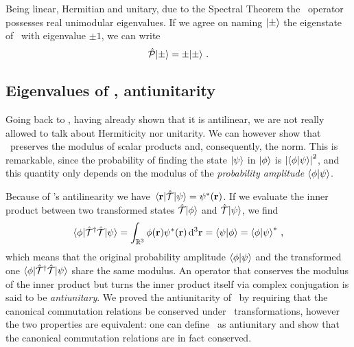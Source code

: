             Being linear, Hermitian and unitary, due to the Spectral Theorem the \hP\ operator possesses real unimodular eigenvalues. If we agree on naming $\ket{\pm}$ the eigenstate of \hP\ with eigenvalue $\pm 1$, we can write
            \begin{equation}
                \label{eq:eigenvalue-problem-P}
                \mathcal{\hat{P}}\!\ket{\pm}
                = \pm\!\ket{\pm}\,\text{.}
            \end{equation}
        
        \subsection{Eigenvalues of \hT, antiunitarity}
            Going back to \hT, having already shown that it is antilinear, we are not really allowed to talk about Hermiticity nor unitarity. We can however show that \hT\ preserves the modulus of scalar products and, consequently, the norm. This is remarkable, since the probability of finding the state $\ket{\psi}$ in $\ket{\phi}$ is $\abs{\braket{\phi}{\psi}}^2$, and this quantity only depends on the modulus of the \emph{probability amplitude} $\braket{\phi}{\psi}$.
            
            Because of \hT's antilinearity we have $\mel{\vb{r}}{\hT}{\psi} = \psi^*\pqty{\vb{r}}$. If we evaluate the inner product between two transformed states $\mathcal{\hat{T}}\!\ket{\phi}$ and $\mathcal{\hat{T}}\!\ket{\psi}$, we find
            \begin{equation*}
                \bra{\phi}\!\hT^\dag\hT\!\ket{\psi}
                = \int\nolimits_{\bbR^3} \phi\pqty{\vb{r}}\psi^*\pqty{\vb{r}}\dd[3]{\vb{r}}
                = \bra{\psi}\ket{\phi}
                = \bra{\phi}\ket{\psi}^*
                \mycomma
            \end{equation*}
            which means that the original probability amplitude $\braket{\phi}{\psi}$ and the transformed one $\bra{\phi}\!\mathcal{\hat{T}}^\dag\mathcal{\hat{T}}\!\ket{\psi}$ share the same modulus. An operator that conserves the modulus of the inner product but turns the inner product itself via complex conjugation is said to be \emph{antiunitary}. We proved the antiunitarity of \hT\ by requiring that the canonical commutation relations be conserved under 
            \hT\ transformations, however the two properties are equivalent: one can define \hT\ as antiunitary and show that the canonical commutation relations are in fact conserved.
            
